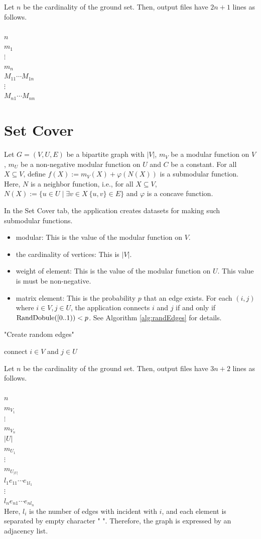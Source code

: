 \documentclass{article}
\newcommand{\randre}{{\rm RandomReal}}
\newcommand{\exTab}[1]{
In the #1 tab,
the application creates datasets for making such submodular functions.}
\newcommand{\out}[1]{
Let $n$ be the cardinality of the ground set.
Then, output files have $#1$ lines as follows.\\ \mbox{}\\
}
\begin{document}
\out{2n+1}
$n$\\
$m_1$ \\
$\vdots$ \\
$m_n$ \\
$M_{11}\cdots M_{1n}$\\
\mbox{\quad \quad}$\vdots$ \\
$M_{n1} \cdots M_{nn}$ \\


\newpage

\section{Set Cover}\label{setCoverSec}
Let $G=(V,U,E)$ be a bipartite graph with $|V|$,
$m_V$ be a modular function on $V$,
$m_U$ be a non-negative modular function on $U$
and $C$ be a constant.
For all $X\subseteq V$,
define $f(X):=m_V(X)+\varphi(N(X))$ is a submodular function.
Here, $N$ is a neighbor function, i.e.,
for all $X\subseteq V$, $N(X):=\{u \in U \mid \exists v\in X~ \{ u,v\}\in E  \} $
and $\varphi$ is a concave function.
\exTab{Set Cover}

\begin{itemize}
\item modular: This is the value of the modular function on $V$.
\item the cardinality of vertices: This is $|V|$.
\item weight of element: This is the value of the modular function on $U$.
This value is must be non-negative.
\item matrix element: This is the probability $p$ that an edge exists.
For each $(i,j)$ where $i\in V,j\in U$,
the application connects $i$ and $j$ if and only if ${\rm RandDobule}([0..1))<p$.
See Algorithm \ref{alg:randEdges} for details.
\end{itemize}


\begin{algorithm}[h!]
\fontsize{10pt}{12.0pt}\selectfont
   \caption{"Create random edges"}
   \label{alg:randEdges}
\begin{algorithmic}
   \IF{ $\randre() < p$}	
   \STATE connect $i\in V$ and $j\in U$
   \ENDIF
   \ENDFOR
   \ENDFOR
\end{algorithmic}
\end{algorithm}

\out{3n+2}
$n$\\
$m_{V_{1}}$ \\
$\vdots$ \\
$m_{V_{n}}$ \\
$|U|$ \\
$m_{U_{1}}$ \\
$\vdots$ \\
$m_{U_{|U|}}$ \\
$l_1e_{11}\cdots e_{1l_1}$\\
\mbox{\quad \quad}$\vdots$ \\
$l_ne_{n1} \cdots e_{nl_n}$ \\

Here, $l_i$ is the number of edges with incident with $i$,
and each element is separated by empty character " ".
Therefore, the graph is expressed by an adjacency list.




\newpage





\end{document}
